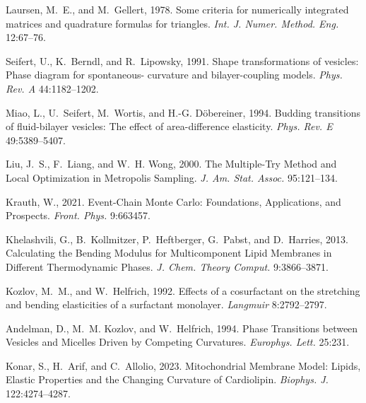 \documentclass[twocolumn]{biophys-new}
\begin{document}
\begin{thebibliography}{52}
Laursen, M.~E., and M.~Gellert, 1978.
\newblock Some criteria for numerically integrated matrices and quadrature
  formulas for triangles.
\newblock \emph{Int. J. Numer. Method. Eng.} 12:67--76.

Seifert, U., K.~Berndl, and R.~Lipowsky, 1991.
\newblock Shape transformations of vesicles: Phase diagram for spontaneous-
  curvature and bilayer-coupling models.
\newblock \emph{Phys. Rev. A} 44:1182--1202.

Miao, L., U.~Seifert, M.~Wortis, and H.-G. D\"obereiner, 1994.
\newblock Budding transitions of fluid-bilayer vesicles: The effect of
  area-difference elasticity.
\newblock \emph{Phys. Rev. E} 49:5389--5407.

Liu, J.~S., F.~Liang, and W.~H. Wong, 2000.
\newblock The Multiple-Try Method and Local Optimization in Metropolis
  Sampling.
\newblock \emph{J. Am. Stat. Assoc.} 95:121--134.

Krauth, W., 2021.
\newblock Event-Chain Monte Carlo: Foundations, Applications, and Prospects.
\newblock \emph{Front. Phys.} 9:663457.

Khelashvili, G., B.~Kollmitzer, P.~Heftberger, G.~Pabst, and D.~Harries, 2013.
\newblock Calculating the Bending Modulus for Multicomponent Lipid Membranes in
  Different Thermodynamic Phases.
\newblock \emph{J. Chem. Theory Comput.} 9:3866--3871.

Kozlov, M.~M., and W.~Helfrich, 1992.
\newblock Effects of a cosurfactant on the stretching and bending elasticities
  of a surfactant monolayer.
\newblock \emph{Langmuir} 8:2792--2797.

Andelman, D., M.~M. Kozlov, and W.~Helfrich, 1994.
\newblock Phase Transitions between Vesicles and Micelles Driven by Competing
  Curvatures.
\newblock \emph{Europhys. Lett.} 25:231.

Konar, S., H.~Arif, and C.~Allolio, 2023.
\newblock Mitochondrial Membrane Model: Lipids, Elastic Properties and the
  Changing Curvature of Cardiolipin.
\newblock \emph{Biophys. J.} 122:4274--4287.


\end{thebibliography}
\end{document}
